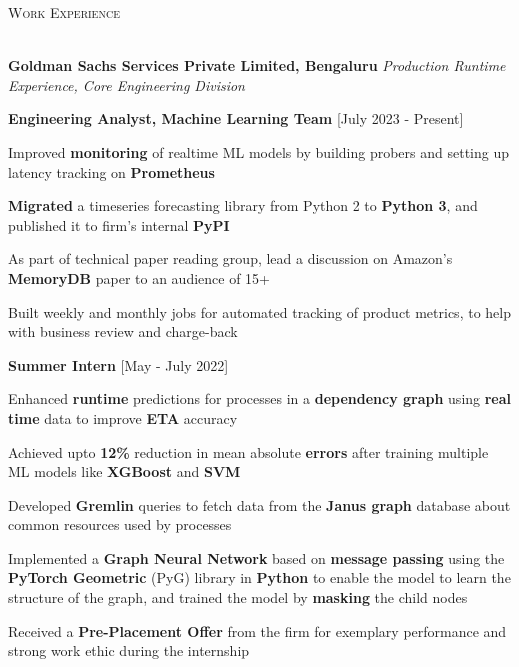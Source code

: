 \documentclass[10pt]{article}
\renewcommand{\section}[1]{
    \vspace*{5pt}
    \textsc{\Large{#1}}
    \vspace*{-8pt} \\ \hspace*{-5pt}
    \hrulefill \\
    \vspace*{-15pt}
    \vspace*{-5pt}
}
\newcommand{\smallbullet}{
    \small$\bullet$
}
\newcommand{\company}[2]{
    {
        \vspace*{3pt}
        \hspace*{-7pt} {\large{\textbf{#1}}} \newline
        \textit{\textsf{#2}} \newline
    }
}
\newcommand{\position}[2]{
    {
        \vspace*{3pt}
        \hspace*{3pt} {\normalsize{\textbf{#1}}} \hfill #2
        \newline
        \vspace{-15pt}
    }
}
\newenvironment{bullet-list-position}{
    \begin{list}{
        \smallbullet
    }{
        \setlength\leftmargin{20pt}\topsep -6pt \itemsep -5pt
    }
} {
    \end{list}
}
\begin{document}

    \section{Work Experience}

    \company{
        Goldman Sachs Services Private Limited, Bengaluru
    }{
        Production Runtime Experience, Core Engineering Division
    }
    \position{Engineering Analyst, Machine Learning Team}{[July 2023 - Present]}
    \begin{bullet-list-position}
        \item Improved \textbf{monitoring} of realtime ML models by building probers and setting up latency tracking on \textbf{Prometheus}
        \item \textbf{Migrated} a timeseries forecasting library from Python 2 to \textbf{Python 3}, and published it to firm's internal \textbf{PyPI}
        \item As part of technical paper reading group, lead a discussion on Amazon's \textbf{MemoryDB} paper to an audience of 15+
        \item Built weekly and monthly jobs for automated tracking of product metrics, to help with business review and charge-back
    \end{bullet-list-position}
    \position{Summer Intern}{[May - July 2022]}
    \vspace{3pt}
    \begin{bullet-list-position}
        \item Enhanced \textbf{runtime} predictions for processes in a \textbf{dependency graph} using \textbf{real time} data to improve \textbf{ETA} accuracy
        \item Achieved upto \textbf{12\%} reduction in mean absolute \textbf{errors} after
        training multiple ML models like \textbf{XGBoost} and \textbf{SVM}
        \item Developed \textbf{Gremlin} queries to fetch data from the \textbf{Janus graph} database about common resources used by processes
        \item Implemented a \textbf{Graph Neural Network} based on \textbf{message passing} using the \textbf{PyTorch Geometric} (PyG) library in \textbf{Python} to enable the model to learn the structure of the graph, and trained the model by \textbf{masking} the child nodes
        \item Received a \textbf{Pre-Placement Offer} from the firm for exemplary performance and strong work ethic during the internship
    \end{bullet-list-position}
\end{document}
